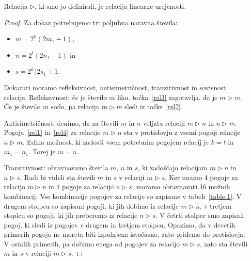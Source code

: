\documentclass[mat2]{fmfdelo}
\begin{document}
\begin{trditev}
Relacija $\triangleright$, ki smo jo definirali, je relacija linearne urejenosti.
\end{trditev}
\begin{proof}
Za dokaz potrebujemo tri poljubna naravna števila:
\begin{itemize}
\item $m= 2^k(2m_1 +1)$,
\item $n= 2^l(2n_1 +1)$ in
\item $s=2^h(2s_1+1$.
\end{itemize}
Dokazati moramo refleksivnost, antisimetričnost, tranzitivnost in sovisnost relacije.
Refleksivnost: če je število $m$ liho, točka~\ref{rel3} zagotavlja, da je $m \triangleright m$. Če je število $m$ sodo, pa relacija $m \triangleright m$ sledi iz točke~\ref{rel2}.

Antisimetričnost: denimo, da za števili $m$ in $n$ veljata relaciji $m \triangleright n$ in $n \triangleright m$. Pogoja~\ref{rel1} in~\ref{rel4} za relacijo $m \triangleright n$ sta v protislovju z vsemi pogoji relacije $n \triangleright m$. Edina možnost, ki zadosti vsem potrebnim pogojem relacij je $k=l$ in $m_1 = n_1$. Torej je $m=n$.

Tranzitivnost: obravnavamo števila $m$,  $n$ in $s$, ki zadoščajo relacijam $m \triangleright n$ in $n \triangleright s$. Radi bi videli sta števili $m$ in $s$ v relaciji $m \triangleright s$. Ker imamo 4 pogoje za relacijo $m \triangleright n$ in 4 pogoje za relacijo $n \triangleright s$, moramo obravnavati 16 možnih kombinacij. Vse kombinacije pogojev za relacije so zapisane v tabeli~\ref{table:1}. V drugem stolpcu so zapisani pogoji, ki jih dobimo iz relacije $m \triangleright n$, v tretjem stoplcu so pogoji, ki jih preberemo iz relacije $n \triangleright s$. V četrti stolpec smo zapisali pogoj, ki sledi iz pogojev v drugem in tretjem stolpcu. Opazimo, da v devetih primerih pogoja ne moreta biti izpolnjena istočasno, zato pridemo do protislovja. V ostalih primerih, pa dobimo enega od pogojev za relacijo $m \triangleright s$, zato sta števili $m$ in $s$ v relaciji $m \triangleright s$.


\end{proof}
\end{document}
